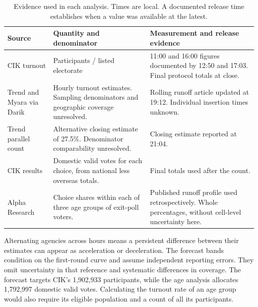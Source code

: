\documentclass[11pt,a4paper]{article}
\begin{document}
\begin{table}[!htbp]\centering\small
\begin{tabular}{@{}p{.18\linewidth}p{.33\linewidth}p{.41\linewidth}@{}}\toprule
Source & Quantity and denominator & Measurement and release evidence\\\midrule
CIK turnout & Participants / listed electorate & 11:00 and 16:00 figures documented by 12:50 and 17:03. Final protocol totals at close.\\
Trend and Myara via Darik & Hourly turnout estimates. Sampling denominators and geographic coverage unresolved. & Rolling runoff article updated at 19:12. Individual insertion times unknown.\\
Trend parallel count & Alternative closing estimate of 27.5\%. Denominator comparability unresolved. & Closing estimate reported at 21:04.\\
CIK results & Domestic valid votes for each choice, from national less overseas totals. & Final totals used after the count.\\
Alpha Research & Choice shares within each of three age groups of exit-poll voters. & Published runoff profile used retrospectively. Whole percentages, without cell-level uncertainty here.\\\bottomrule
\end{tabular}
\caption{Evidence used in each analysis. Times are local. A documented release time establishes when a value was available at the latest.}
\end{table}
Alternating agencies across hours means a persistent difference between their estimates can appear as acceleration or deceleration. The forecast bands condition on the first-round curve and assume independent reporting errors. They omit uncertainty in that reference and systematic differences in coverage. The forecast targets CIK's 1,902,933 participants, while the age analysis allocates 1,792,997 domestic valid votes. Calculating the turnout rate of an age group would also require its eligible population and a count of all its participants.
\end{document}
